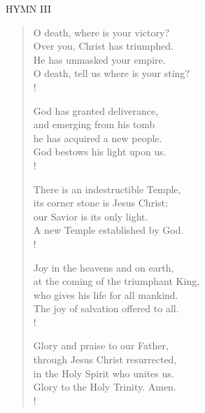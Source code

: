 \noindent\small{\uppercase{Hymn III}}\normalsize
\begin{verse}
O death, where is your victory?\\
Over you, Christ has triumphed.\\
He has unmasked your empire.\\
O death, tell us where is your sting?\\!

God has granted deliverance, \\
and emerging from his tomb\\
he has acquired a new people.\\
God bestows his light upon us.\\!

There is an indestructible Temple,\\
its corner stone is Jesus Christ;\\
our Savior is its only light.\\
A new Temple established by God.\\!

Joy in the heavens and on earth,\\
at the coming of the triumphant King,\\
who gives his life for all mankind.\\
The joy of salvation offered to all.\\!

Glory and praise to our Father,\\
through Jesus Christ resurrected,\\
in the Holy Spirit who unites us.\\
Glory to the Holy Trinity. Amen.\\!
\end{verse}
